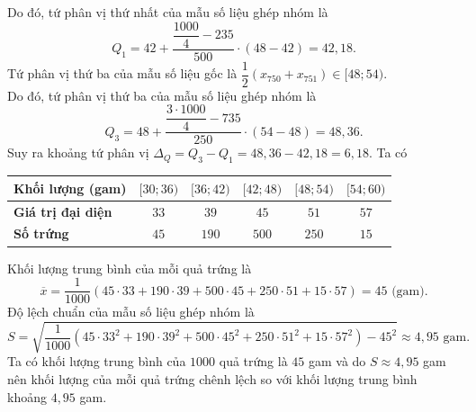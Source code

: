 \begin{ex}[Mức độ 3]
{\begin{itemchoice}
			Do đó, tứ phân vị thứ nhất của mẫu số liệu ghép nhóm là
			$$ Q_1 = 42 + \dfrac{\dfrac{1000}{4} - 235}{500} \cdot (48 - 42) = 42{,}18.$$
			Tứ phân vị thứ ba của mẫu số liệu gốc là $\dfrac{1}{2}(x_{750} + x_{751}) \in [48; 54)$.\\
			Do đó, tứ phân vị thứ ba của mẫu số liệu ghép nhóm là
			$$ Q_3 = 48 + \dfrac{\dfrac{3\cdot 1000}{4} - 735}{250} \cdot (54 - 48) = 48{,}36.$$
			Suy ra khoảng tứ phân vị $\Delta_Q = Q_3 - Q_1 = 48{,}36 - 42{,}18 = 6{,}18$.
			\itemch Ta có
			\begin{center}
				\begin{tabular}{|l|c|c|c|c|c|}
					\hline
					\textbf{Khối lượng (gam)} & $[30; 36)$ & $ [36; 42)$ & $ [42; 48)$ & $ [48; 54)$ & $ [54; 60)$   \\
					\hline
					\textbf{Giá trị đại diện} & $33$ & $39$ & $45$ & $51$ & $57$ \\ \hline
					\textbf{Số trứng }&$45$ & $190$ & $500$ & $250$ & $15$ \\ 
					\hline
				\end{tabular}
			\end{center}
			Khối lượng trung bình của mỗi quả trứng là $$\overline{x} = \dfrac{1}{1000}\left(45\cdot 33 + 190\cdot 39 + 500\cdot 45 + 250\cdot 51 + 15\cdot 57\right) = 45 \text{ (gam)}.$$
			Độ lệch chuẩn của mẫu số liệu ghép nhóm là
			$$S = \sqrt{\dfrac{1}{1000}\left(45\cdot 33^2 + 190\cdot 39^2 + 500\cdot 45^2 + 250\cdot 51^2 + 15\cdot 57^2\right) - 45^2} \approx 4{,}95 \text{ gam}.$$
			\itemch Ta có khối lượng trung bình của $1000$ quả trứng là $45$ gam và do $S \approx 4{,}95$ gam nên khối lượng của mỗi quả trứng chênh lệch so với khối lượng trung bình khoảng $4{,}95$ gam.
		\end{itemchoice}
	}
\end{ex}

